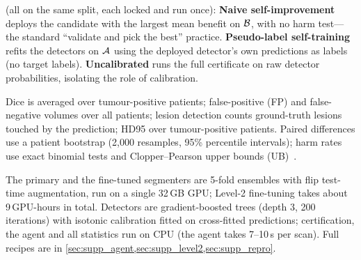  (all on the same split, each locked and run once):
\textbf{Naive self-improvement} deploys the candidate with the largest mean benefit on $\mathcal{B}$, with no harm test---the standard ``validate and pick the best'' practice.
\textbf{Pseudo-label self-training}~\cite{lee2013pseudo} refits the detectors on $\mathcal{A}$ using the deployed detector's own predictions as labels (no target labels).
\textbf{Uncalibrated \ours} runs the full certificate on raw detector probabilities, isolating the role of calibration.

 Dice is averaged over tumour-positive patients; false-positive (FP) and false-negative volumes over all patients; lesion detection counts ground-truth lesions touched by the prediction; HD95 over tumour-positive patients.
Paired differences use a patient bootstrap (2,000 resamples, 95\% percentile intervals); harm rates use exact binomial tests and Clopper--Pearson upper bounds (UB)~\cite{clopper1934use}.

 The primary and the fine-tuned segmenters are 5-fold ensembles with flip test-time augmentation, run on a single 32\,GB GPU; Level-2 fine-tuning takes about 9\,GPU-hours in total.
Detectors are gradient-boosted trees (depth 3, 200 iterations) with isotonic calibration fitted on cross-fitted predictions; certification, the agent and all statistics run on CPU (the agent takes 7--10\,s per scan).
Full recipes are in \cref{sec:supp_agent,sec:supp_level2,sec:supp_repro}.
